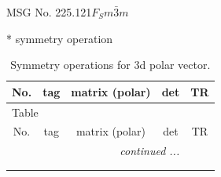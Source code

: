\documentclass[fleqn,8pt]{jsarticle}
\begin{document}
\setcounter{MaxMatrixCols}{32}

\renewcommand{\tablename}{Table~}
\renewcommand{\figurename}{Figure~}
\begin{center}
\LARGE
MSG No. 225.121\quad$F_{S}m\bar{3}m$
\end{center}
* symmetry operation
\renewcommand{\arraystretch}{1.3}
\begin{longtable}{ccccc}
\caption{Symmetry operations for 3d polar vector.}
 \\
 \hline \hline
No. & tag & matrix (polar) & det & TR \\ \hline \endfirsthead

\multicolumn{4}{l}{\tablename\ \thetable{}} \\
 \hline \hline
No. & tag & matrix (polar) & det & TR \\ \hline \endhead

 \hline \hline
\multicolumn{4}{r}{\footnotesize\it continued ...} \\ \endfoot

 \hline \hline
\multicolumn{4}{r}{} \\ \endlastfoot


\end{longtable}
\end{document}
